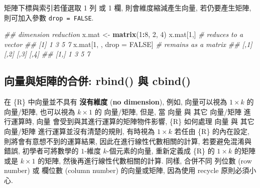 \documentclass[
]{book}
\newenvironment{Shaded}{\begin{snugshade}}{\end{snugshade}}
\newcommand{\CommentTok}[1]{\textcolor[rgb]{0.56,0.35,0.01}{\textit{#1}}}
\newcommand{\DecValTok}[1]{\textcolor[rgb]{0.00,0.00,0.81}{#1}}
\newcommand{\KeywordTok}[1]{\textcolor[rgb]{0.13,0.29,0.53}{\textbf{#1}}}
\newcommand{\NormalTok}[1]{#1}
\newcommand{\OperatorTok}[1]{\textcolor[rgb]{0.81,0.36,0.00}{\textbf{#1}}}
\newcommand{\OtherTok}[1]{\textcolor[rgb]{0.56,0.35,0.01}{#1}}
\newcommand{\StringTok}[1]{\textcolor[rgb]{0.31,0.60,0.02}{#1}}
\begin{document}
矩陣下標與索引若僅選取 1 列 或 1 欄,
則會維度縮減產生向量, 若仍要產生矩陣, 則可加入參數
\texttt{drop\ =\ FALSE}.

\begin{Shaded}
\begin{Highlighting}[]
\CommentTok{\#\# dimension reduction}
\NormalTok{x.mat \textless{}{-}}\StringTok{ }\KeywordTok{matrix}\NormalTok{(}\DecValTok{1}\OperatorTok{:}\DecValTok{8}\NormalTok{, }\DecValTok{2}\NormalTok{, }\DecValTok{4}\NormalTok{)}
\NormalTok{x.mat[}\DecValTok{1}\NormalTok{,] }\CommentTok{\# reduces to a vector}
\CommentTok{\#\# [1] 1 3 5 7}
\NormalTok{x.mat[}\DecValTok{1}\NormalTok{, , drop =}\StringTok{ }\OtherTok{FALSE}\NormalTok{] }\CommentTok{\# remains as a matrix}
\CommentTok{\#\#      [,1] [,2] [,3] [,4]}
\CommentTok{\#\# [1,]    1    3    5    7}
\end{Highlighting}
\end{Shaded}

\hypertarget{ux5411ux91cfux8207ux77e9ux9663ux7684ux5408ux4f75-rbind-ux8207-cbind}{%
\subsection{向量與矩陣的合併: rbind() 與 cbind()}\label{ux5411ux91cfux8207ux77e9ux9663ux7684ux5408ux4f75-rbind-ux8207-cbind}}

在 \{R\} 中向量並不具有
\textbf{沒有維度}
(\textbf{no dimension}),
例如,
向量可以視為 \(1 \times k\) 的 向量/矩陣,
也可以視為 \(k \times 1\) 的 向量/矩陣,
但是,
當 向量 與 其它 向量/矩陣 進行運算時,
向量 會受到與其進行運算的矩陣物件影響,
\{R\} 如何處理 向量 與 其它 向量/矩陣 進行運算並沒有清楚的規則,
有時視為 \(1 \times k\)
若任由 \{R\} 的內在設定,
則將會有意想不到的運算結果,
因此在進行線性代數相關的計算,
若要避免混淆與錯誤,
初學者可將數學的 \(1\)-維度 \(k\)-個元素的向量,
重新定義成 \{R\} 的 \(1 \times k\) 的矩陣 或是 \(k \times 1\) 的矩陣,
然後再進行線性代數相關的計算.
同樣, 合併不同 列位數 (row number) 或 欄位數 (column number)
的向量或矩陣, 因為使用 recycle 原則必須小心.
\end{document}
